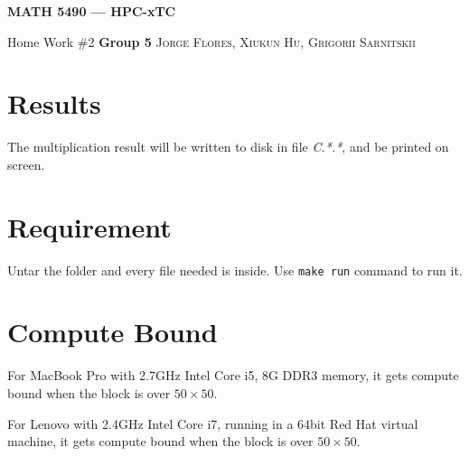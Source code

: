 \documentclass[12pt]{article}
\newcommand{\0}{\mathbf{0}}
\begin{document}

\setlength{\parskip}{0.125in}




\centerline{\bf \Large MATH 5490 --- HPC-xTC}

\bigskip
\centerline{\large Home Work \#2 \qquad \textbf{Group 5} \textsc{Jorge Flores, Xiukun Hu, Grigorii Sarnitskii }}

\section{Results}

The multiplication result will be written to disk in file \textit{C.*.*}, and be printed on screen.

\section{Requirement}

Untar the folder and every file needed is inside. Use \texttt{make run} command to run it.

\section{Compute Bound}

For MacBook Pro with 2.7GHz Intel Core i5, 8G DDR3 memory, it gets compute bound when the block is over $50\times 50$.

For Lenovo with 2.4GHz Intel Core i7, running in a 64bit Red Hat virtual machine, it gets compute bound when the block is over $50\times 50$.
\end{document}
